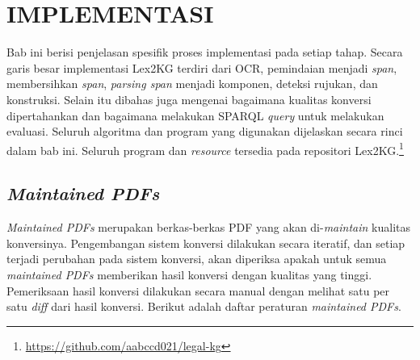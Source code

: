 \chapter{IMPLEMENTASI}
\label{chap:4}

Bab ini berisi penjelasan spesifik proses implementasi pada setiap tahap. Secara garis besar
implementasi Lex2KG terdiri dari OCR, pemindaian menjadi \textit{span}, membersihkan \textit{span},
\textit{parsing span} menjadi komponen, deteksi rujukan, dan konstruksi. Selain itu dibahas juga
mengenai bagaimana kualitas konversi dipertahankan dan bagaimana melakukan SPARQL \textit{query}
untuk melakukan evaluasi. Seluruh algoritma dan program yang digunakan dijelaskan secara rinci dalam
bab ini. Seluruh program dan \textit{resource} tersedia pada repositori
Lex2KG.\footnote{\url{https://github.com/aabccd021/legal-kg}}

\section{\textit{Maintained PDFs}}
\label{sec:maintained-pdfs}

\textit{Maintained PDFs} merupakan berkas-berkas PDF \legal yang akan di-\textit{maintain} kualitas
konversinya. Pengembangan sistem konversi dilakukan secara iteratif, dan setiap terjadi perubahan
pada sistem konversi, akan diperiksa apakah untuk semua \textit{maintained PDFs} memberikan hasil
konversi dengan kualitas yang tinggi. Pemeriksaan hasil konversi dilakukan secara manual dengan
melihat satu per satu \textit{diff} dari hasil konversi. Berikut adalah daftar peraturan
\textit{maintained PDFs}.

